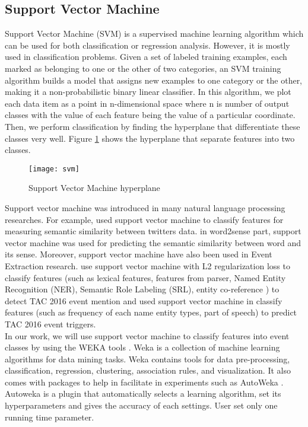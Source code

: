 \subsection{Support Vector Machine}
Support Vector Machine (SVM) is a supervised machine learning algorithm which can be used for both classification or regression analysis. However,  it is mostly used in classification problems. Given a set of labeled training examples, each marked as belonging to one or the other of two categories, an SVM training algorithm builds a model that assigns new examples to one category or the other, making it a non-probabilistic binary linear classifier. In this algorithm, we plot each data item as a point in n-dimensional space where n is number of output classes with the value of each feature being the value of a particular coordinate. Then, we perform classification by finding the hyperplane that differentiate these classes very well. Figure \ref{fig:svm} shows the hyperplane that separate features into two classes.
\begin{figure}
    \centering
    \texttt{[image: svm]}
    \caption{Support Vector Machine hyperplane}
    \label{fig:svm}
\end{figure}
Support vector machine was introduced in many natural language processing researches. For example,  \cite{satyapanich2015ebiquity} used support vector machine to classify features for measuring semantic similarity between twitters data. \cite{kashyap2016robust} in word2sense part, support vector machine was used for predicting the semantic similarity between word and its sense. Moreover, support vector machine have also been used in Event Extraction research. \cite{tsetsai2016event} use support vector machine with L2 regularization loss to classify features (such as lexical features, features from parser, Named Entity Recognition (NER), Semantic Role Labeling (SRL), entity co-reference ) to detect TAC 2016 event mention and \cite{satyapanich2016event} used support vector machine in classify features (such as frequency of each name entity types, part of speech) to predict TAC 2016 event triggers.  \\
\indent In our work, we will use support vector machine to classify features into event classes by using the WEKA tools \cite{hall2009weka}. Weka is a collection of machine learning algorithms for data mining tasks.  Weka contains tools for data pre-processing, classification, regression, clustering, association rules, and visualization. It also comes with packages to help in facilitate in experiments such as AutoWeka \cite{thornton2013auto}. Autoweka is a plugin that automatically selects a learning algorithm, set its hyperparameters and gives the accuracy of each settings. User set only one running time parameter. 

